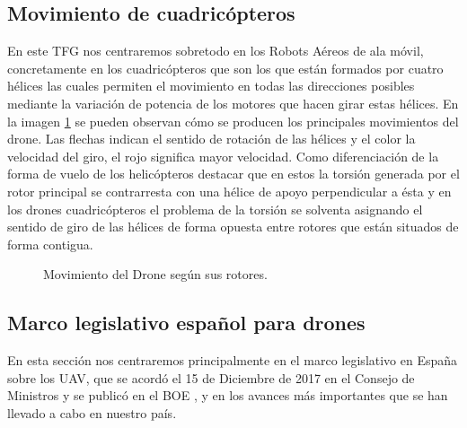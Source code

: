 \subsection{Movimiento de cuadricópteros}
\hspace{1cm} En este TFG nos centraremos sobretodo en los Robots Aéreos de ala móvil, concretamente en los cuadricópteros que son los que están formados por cuatro hélices las cuales permiten el movimiento en todas las direcciones posibles mediante la variación de potencia de los motores que hacen girar estas hélices. En la imagen \ref{f:Moviento en drones.} se pueden observan cómo se producen los principales movimientos del drone. Las flechas indican el sentido de rotación de las hélices y el color la velocidad del giro, el rojo significa mayor velocidad. Como diferenciación de la forma de vuelo de los helicópteros destacar que en estos la torsión generada por el rotor principal se contrarresta con una hélice de apoyo perpendicular a ésta y en los drones cuadricópteros el problema de la torsión se solventa asignando el sentido de giro de las hélices de forma opuesta entre rotores que están situados de forma contigua.

\begin{figure}[H]
 \centering
 \caption{Movimiento del Drone según sus rotores.}
 \label{f:Moviento en drones.}
\end{figure}

\subsection{Marco legislativo español para drones}
\hspace{1cm} En esta sección nos centraremos principalmente en el marco legislativo en España sobre los UAV, que se acordó el 15 de Diciembre de 2017 en el Consejo de Ministros y se publicó en el BOE \cite{BOE}, y en los avances más importantes que se han llevado a cabo en nuestro país. 

